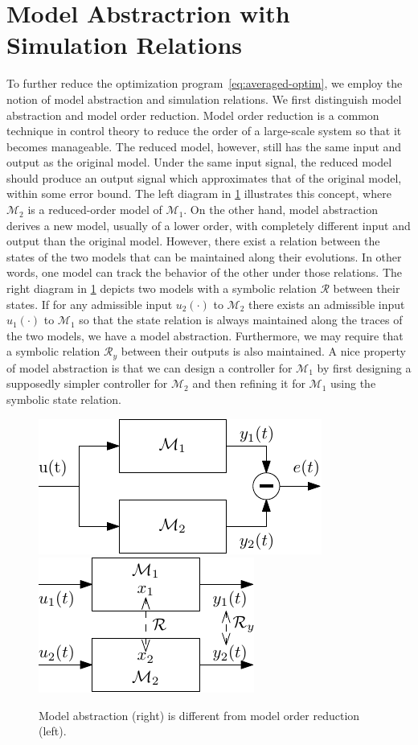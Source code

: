 \section{Model Abstractrion with Simulation Relations}
\label{sec:abstraction}

To further reduce the optimization program~\eqref{eq:averaged-optim}, we
employ the notion of model abstraction and simulation relations. We first
distinguish model abstraction and model order reduction. Model order reduction
is a common technique in control theory to reduce the order of a large-scale
system so that it becomes manageable. The reduced model, however, still has
the same input and output as the original model. Under the same input signal,
the reduced model should produce an output signal which approximates that of
the original model, within some error bound. The left diagram in
\cref{fig:reduction-vs-abstraction} illustrates this concept, where
$\mathcal{M}_2$ is a reduced-order model of $\mathcal{M}_1$. On the other
hand, model abstraction derives a new model, usually of a lower order, with
completely different input and output than the original model. However, there
exist a relation between the states of the two models that can be maintained
along their evolutions. In other words, one model can track the behavior of
the other under those relations. The right diagram in
\cref{fig:reduction-vs-abstraction} depicts two models with a symbolic
relation $\mathcal{R}$ between their states. If for any admissible input $u_2
(\cdot)$ to $\mathcal{M}_2$ there exists an admissible input $u_1 (\cdot)$ to
$\mathcal{M}_1$ so that the state relation is always maintained along the
traces of the two models, we have a model abstraction. Furthermore, we may
require that a symbolic relation $\mathcal{R}_y$ between their outputs is also
maintained. A nice property of model abstraction is that we can design a
controller for $\mathcal{M}_1$ by first designing a supposedly simpler
controller for $\mathcal{M}_2$ and then refining it for $\mathcal{M}_1$ using
the symbolic state relation.

\begin{figure}[tbh]
\includegraphics[width=0.48\columnwidth]{figs/model_order_reduction}
\hfill
\includegraphics[width=0.48\columnwidth]{figs/model_abstraction}
\caption{\label{fig:reduction-vs-abstraction}Model abstraction (right) is
  different from model order reduction (left).}
\end{figure}

